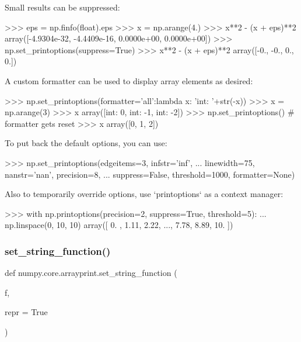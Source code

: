 \begin{DoxyVerb}
Small results can be suppressed:

>>> eps = np.finfo(float).eps
>>> x = np.arange(4.)
>>> x**2 - (x + eps)**2
array([-4.9304e-32, -4.4409e-16,  0.0000e+00,  0.0000e+00])
>>> np.set_printoptions(suppress=True)
>>> x**2 - (x + eps)**2
array([-0., -0.,  0.,  0.])

A custom formatter can be used to display array elements as desired:

>>> np.set_printoptions(formatter={'all':lambda x: 'int: '+str(-x)})
>>> x = np.arange(3)
>>> x
array([int: 0, int: -1, int: -2])
>>> np.set_printoptions()  # formatter gets reset
>>> x
array([0, 1, 2])

To put back the default options, you can use:

>>> np.set_printoptions(edgeitems=3, infstr='inf',
... linewidth=75, nanstr='nan', precision=8,
... suppress=False, threshold=1000, formatter=None)

Also to temporarily override options, use `printoptions` as a context manager:

>>> with np.printoptions(precision=2, suppress=True, threshold=5):
...     np.linspace(0, 10, 10)
array([ 0.  ,  1.11,  2.22, ...,  7.78,  8.89, 10.  ])\end{DoxyVerb}
 \mbox{\label{namespacenumpy_1_1core_1_1arrayprint_aa93ad4b5a722166e031bbf5066a2fefe}} 
\subsubsection{\texorpdfstring{set\+\_\+string\+\_\+function()}{set\_string\_function()}}
{\footnotesize\ttfamily def numpy.\+core.\+arrayprint.\+set\+\_\+string\+\_\+function (\begin{DoxyParamCaption}\item[{}]{f,  }\item[{}]{repr = {\ttfamily True} }\end{DoxyParamCaption})}

